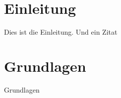 \documentclass[
cleardoublepage=empty,	%
fontsize=11pt,			%
a4paper,				%
toc=bibliography,		%
listof=leveldown,		%
twoside,				%
BCOR=13mm,				%
headinclude=true,		%
footinclude=false,		%
parskip=half,			%
DIV=10					%
]{scrbook}				%
\begin{document}
	\frontmatter
    
    
    \tableofcontents
    \cleardoublepage
	\mainmatter
	\chapter{Einleitung}
	Dies ist die Einleitung. Und ein Zitat~\citep{TestEntry}
	\chapter{Grundlagen}
	Grundlagen
	
	
	\begingroup
		\let\chapter=\section
		\listoffigures %
		\listoftables %
	\endgroup
	\appendix
\end{document}
